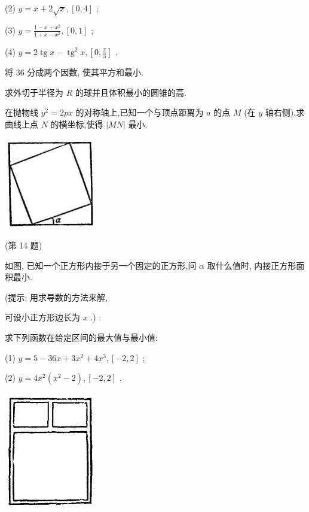 \documentclass[lang=cn,newtx,12pt,scheme=chinese]{elegantbook}
\begin{document}
\begin{problemset}[习 题 十 一]
(2) \(y = x + 2\sqrt{x},\left\lbrack {0,4}\right\rbrack\) ;

(3) \(y = \frac{1 - x + {x}^{2}}{1 + x - {x}^{2}},\left\lbrack {0,1}\right\rbrack\) ;

(4) \(y = 2\operatorname{tg}x - {\operatorname{tg}}^{2}x,\left\lbrack {0,\frac{\pi }{3}}\right\rbrack\) .

\item 将 36 分成两个因数, 使其平方和最小.

\item 求外切于半径为 \(R\) 的球并且体积最小的圆锥的高.

\item 在抛物线 \({y}^{2} = {2px}\) 的对称轴上,已知一个与顶点距离为 \(a\) 的点 \(M\) (在 \(y\) 轴右侧),求曲线上点 \(N\) 的横坐标,使得 \(\left| {MN}\right|\) 最小.

\begin{center}
\includegraphics[max width=0.3\textwidth]{images/01912c18-5c3f-733d-b775-749ba9897a9d_156_776700.jpg}
\end{center}

(第 14 题)

\item 如图, 已知一个正方形内接于另一个固定的正方形,问 \(\alpha\) 取什么值时, 内接正方形面积最小.

(提示: 用求导数的方法来解,

可设小正方形边长为 \(x\) .) :

\item 求下列函数在给定区间的最大值与最小值:

(1) \(y = 5 - {36x} + 3{x}^{2} + 4{x}^{3},\left\lbrack {-2,2}\right\rbrack\) ;

(2) \(y = 4{x}^{2}\left( {{x}^{2} - 2}\right) ,\left\lbrack {-2,2}\right\rbrack\) .

\begin{center}
\includegraphics[max width=0.3\textwidth]{images/01912c18-5c3f-733d-b775-749ba9897a9d_157_303198.jpg}
\end{center}


\end{problemset}
\end{document}
